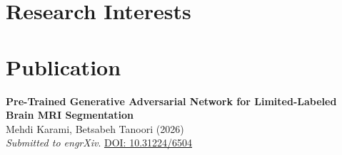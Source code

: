 \documentclass[letter,10pt]{article}
\begin{document}
\section*{Research Interests}

\noindent
{}

\noindent
{}

\section*{Publication}
\begin{enumerate}[label={[\arabic*]}, nosep, leftmargin=*, itemsep=10pt]
    \item \textbf{Pre-Trained Generative Adversarial Network for Limited-Labeled Brain MRI Segmentation}\\
    Mehdi Karami, Betsabeh Tanoori (2026)\\
    \textit{Submitted to engrXiv}.
    \href{https://doi.org/10.31224/6504}{DOI: 10.31224/6504}
\end{enumerate}

\end{document}
